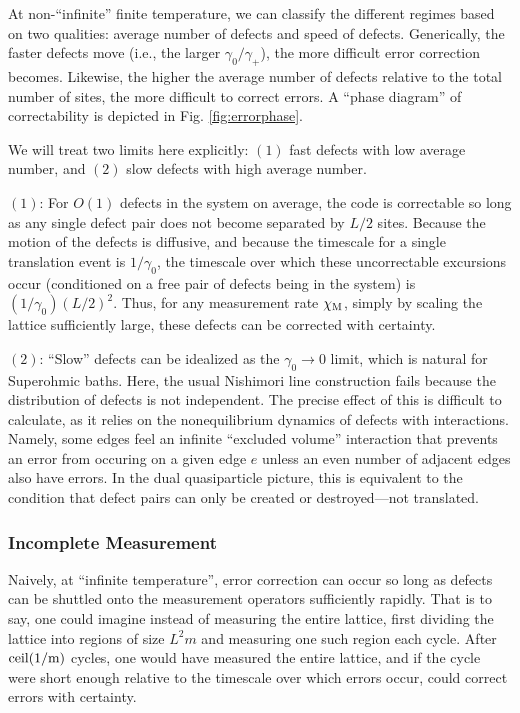 \documentclass[twocolumn,superscriptaddress,aps,prb,floatfix]{revtex4-1}
\newcommand{\figref}[1]{Fig. \ref{#1}}
\begin{document}
  At non-``infinite'' finite temperature, we can classify the different regimes based on two qualities: average number of defects and speed of defects.  Generically, the faster defects move (i.e., the larger $\gamma_0 / \gamma_+$), the more difficult error correction becomes.  Likewise, the higher the average number of defects relative to the total number of sites, the more difficult to correct errors.  A ``phase diagram'' of correctability is depicted in \figref{fig:errorphase}.
  
  We will treat two limits here explicitly: $(1)$ fast defects with low average number, and $(2)$ slow defects with high average number.

 $(1)$: For $O(1)$ defects in the system on average, the code is correctable so long as any single defect pair does not become separated by $L/2$ sites.  Because the motion of the defects is diffusive, and because the timescale for a single translation event is $1/\gamma_0$, the timescale over which these uncorrectable excursions occur (conditioned on a free pair of defects being in the system) is $(1/\gamma_0) (L/2)^2$.  Thus, for any measurement rate $\chi_{\rm{M}}$, simply by scaling the lattice sufficiently large, these defects can be corrected with certainty.
 
 $(2)$: ``Slow'' defects can be idealized as the $\gamma_0\rightarrow 0$ limit, which is natural for Superohmic baths.  Here, the usual Nishimori line construction fails because the distribution of defects is not independent.  The precise effect of this is difficult to calculate, as it relies on the nonequilibrium dynamics of defects with interactions.  Namely, some edges feel an infinite ``excluded volume'' interaction that prevents an error from occuring on a given edge $e$ unless an even number of adjacent edges also have errors.  In the dual quasiparticle picture, this is equivalent to the condition that defect pairs can only be created or destroyed---not translated.
  
 
 
 \subsubsection{Incomplete Measurement}
 
  Naively, at ``infinite temperature'', error correction can occur so long as defects can be shuttled onto the measurement operators sufficiently rapidly.  That is to say, one could imagine instead of measuring the entire lattice, first dividing the lattice into regions of size $L^2 m$ and measuring one such region each cycle.  After $\rm{ceil}(1/m)$ cycles, one would have measured the entire lattice, and if the cycle were short enough relative to the timescale over which errors occur, could correct errors with certainty.
 
\end{document}

